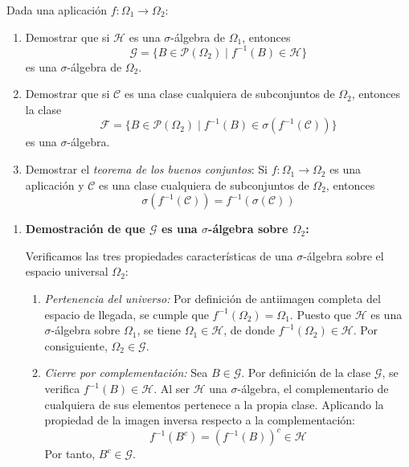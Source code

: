 \newpage
\begin{problema}
Dada una aplicación $f : \Omega_1 \to \Omega_2$:
\begin{enumerate}[label=\alph*)]
    \item Demostrar que si $\mathcal{H}$ es una $\sigma$-álgebra de $\Omega_1$, entonces
    \[
        \mathcal{G} = \{ B \in \mathcal{P}(\Omega_2) \mid f^{-1}(B) \in \mathcal{H} \}
    \]
    es una $\sigma$-álgebra de $\Omega_2$.
    \item Demostrar que si $\mathcal{C}$ es una clase cualquiera de subconjuntos de $\Omega_2$, entonces la clase
    \[
        \mathcal{F} = \{ B \in \mathcal{P}(\Omega_2) \mid f^{-1}(B) \in \sigma(f^{-1}(\mathcal{C})) \}
    \]
    es una $\sigma$-álgebra.
    \item Demostrar el \textit{teorema de los buenos conjuntos}: Si $f : \Omega_1 \to \Omega_2$ es una aplicación y $\mathcal{C}$ es una clase cualquiera de subconjuntos de $\Omega_2$, entonces
    \[
        \sigma(f^{-1}(\mathcal{C})) = f^{-1}(\sigma(\mathcal{C}))
    \]
\end{enumerate}

\tcblower

\begin{enumerate}[label=\alph*)]
    \item \textbf{Demostración de que $\mathcal{G}$ es una $\sigma$-álgebra sobre $\Omega_2$:}
    
    Verificamos las tres propiedades características de una $\sigma$-álgebra sobre el espacio universal $\Omega_2$:
    \begin{enumerate}[label=\arabic*.]
        \item \textit{Pertenencia del universo:}
        Por definición de antiimagen completa del espacio de llegada, se cumple que $f^{-1}(\Omega_2) = \Omega_1$. Puesto que $\mathcal{H}$ es una $\sigma$-álgebra sobre $\Omega_1$, se tiene $\Omega_1 \in \mathcal{H}$, de donde $f^{-1}(\Omega_2) \in \mathcal{H}$. Por consiguiente, $\Omega_2 \in \mathcal{G}$.

        \item \textit{Cierre por complementación:}
        Sea $B \in \mathcal{G}$. Por definición de la clase $\mathcal{G}$, se verifica $f^{-1}(B) \in \mathcal{H}$.
        Al ser $\mathcal{H}$ una $\sigma$-álgebra, el complementario de cualquiera de sus elementos pertenece a la propia clase. Aplicando la propiedad de la imagen inversa respecto a la complementación:
        \[
            f^{-1}(B^c) = (f^{-1}(B))^c \in \mathcal{H}
        \]
        Por tanto, $B^c \in \mathcal{G}$.


\end{enumerate}
\end{enumerate}
\end{problema}
